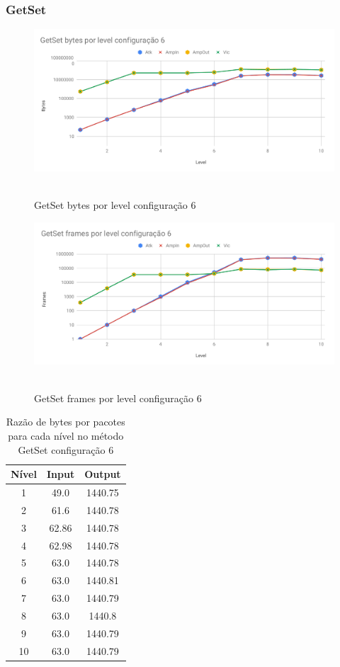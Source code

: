 \subsubsection{GetSet}

\begin{figure}[H]
     \centering
     \label{graf:GetSetBytes6}
     \includegraphics[scale=0.6]{img/capturas/GetSetBLC6.pdf}\
     \caption{GetSet bytes por level configuração 6}
\end{figure}

\begin{figure}[H]
     \centering
     \label{graf:GetSetFrames6}
     \includegraphics[scale=0.6]{img/capturas/GetSetFLC6.pdf}\
     \caption{GetSet frames por level configuração 6}
\end{figure}

\begin{table}[H]
\centering
\label{tab:bytespacsGetSet6}
\caption{Razão de bytes por pacotes para cada nível no método GetSet configuração 6}
\begin{tabular}{|c|c|c|}
\hline
Nível & Input & Output  \\ \hline
1     & 49.0  & 1440.75 \\ \hline
2     & 61.6  & 1440.78 \\ \hline
3     & 62.86 & 1440.78 \\ \hline
4     & 62.98 & 1440.78 \\ \hline
5     & 63.0  & 1440.78 \\ \hline
6     & 63.0  & 1440.81 \\ \hline
7     & 63.0  & 1440.79 \\ \hline
8     & 63.0  & 1440.8  \\ \hline
9     & 63.0  & 1440.79 \\ \hline
10    & 63.0  & 1440.79 \\ \hline
\end{tabular}
\end{table}

